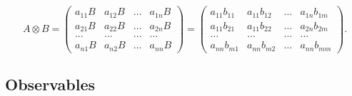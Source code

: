 \documentclass[pra,amsfonts,showpacs,showkeys,preprint]{revtex4}
\begin{document}
\begin{equation}
A\otimes B
=
\left(
\begin{array}{cccccccccc}
a_{11} B& a_{12} B& \ldots & a_{1n}B \\
a_{21} B& a_{22} B& \ldots & a_{2n}B \\
\ldots & \ldots & \ldots & \ldots \\
a_{n1} B& a_{n2} B& \ldots & a_{nn}B
\end{array}
\right)
=
\left(
\begin{array}{cccccccccc}
a_{11} b_{11}& a_{11} b_{12} & \ldots & a_{1n}b_{1m} \\
a_{11} b_{21}& a_{11} b_{22}& \ldots & a_{2n} b_{2m}\\
\ldots & \ldots & \ldots & \ldots \\
a_{nn} b_{m1}& a_{nn} b_{m2}& \ldots & a_{nn} b_{mm}
\end{array}
\right)
.
\end{equation}

\subsection{Observables}
\end{document}
